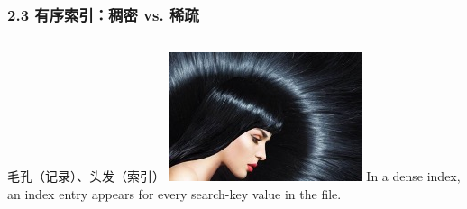 \documentclass[aspectratio=169, 14pt]{beamer}
\begin{document}
\begin{frame}
    \frametitle{2.3 有序索引：稠密 vs. 稀疏}
    \begin{columns}
        毛孔（记录）、头发（索引）
        \includegraphics[width=.99\textwidth]{week11/hair}
        In a dense index, an index entry appears for every search-key value in the file.
    \end{columns}

\end{frame}
\end{document}
